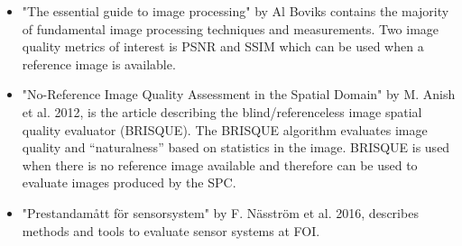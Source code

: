 \begin{itemize}

\item \cite{book:image_processing} "The essential guide to image processing" by Al Boviks contains the majority of fundamental image processing techniques and measurements. Two image quality metrics of interest is PSNR and SSIM which can be used when a reference image is available.
    
\item \cite{article:brisque} "No-Reference Image Quality Assessment
in the Spatial Domain" by M. Anish et al. 2012, is the article describing the blind/referenceless image spatial quality evaluator (BRISQUE). The BRISQUE algorithm evaluates image quality and “naturalness” based on statistics in the image. BRISQUE is used when there is no reference image available and therefore can be used to evaluate images produced by the SPC.  
    
\item \cite{article:FOI_pres_sens} "Prestandamått för sensorsystem" by F. Näsström et al. 2016, describes methods and tools to evaluate sensor systems at FOI. 
    
\end{itemize}





